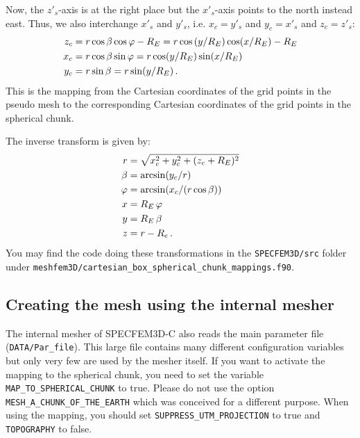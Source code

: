 %
Now, the $z'_s$-axis is at the right place but the $x'_s$-axis points to the north instead east. Thus, we also interchange $x'_s$ and $y'_s$, i.e. $x_c = y'_s$ and $y_c = x'_s$ and $z_c = z'_s$:
%
\begin{align}
	z_c & = r\cos\beta\cos\varphi-R_E = r\cos\left(y/R_E\right)\cos(x/R_E)-R_E \notag \\
    x_c & = r\cos\beta\sin\varphi \notag = r\cos(y/R_E)\sin(x/R_E) \\
	y_c & = r\sin\beta = r\sin(y/R_E)\,.
\end{align}
%
This is the mapping from the Cartesian coordinates of the grid points in the pseudo mesh to the corresponding Cartesian coordinates of the grid points in the spherical chunk.

The inverse transform is given by:
%
\begin{align}
	r &= \sqrt{x_c^2+y_c^2+(z_c+R_E)^2} \notag \\
	\beta &= \arcsin(y_c/r) \notag \\
	\varphi &= \arcsin(x_c/(r\cos\beta)) \notag \\
	x &= R_E\,\varphi \notag \\
	y & = R_E\,\beta \notag \\
	z &= r-R_e \,.
\end{align}
%
You may find the code doing these transformations in the \verb+SPECFEM3D/src+ folder under \verb+meshfem3D/cartesian_box_spherical_chunk_mappings.f90+.
%
\subsection{Creating the mesh using the internal mesher}
%
 The internal mesher of SPECFEM3D-C also reads the main parameter file (\verb+DATA/Par_file+).
 This large file contains many different configuration variables but only very few are used by the mesher itself. If you want to activate the mapping to the spherical chunk, you need to set the variable \verb+MAP_TO_SPHERICAL_CHUNK+ to true. Please do not use the option \verb+MESH_A_CHUNK_OF_THE_EARTH+ which was conceived for a different purpose. When using the mapping, you should set \verb+SUPPRESS_UTM_PROJECTION+ to true and \verb+TOPOGRAPHY+ to false.

